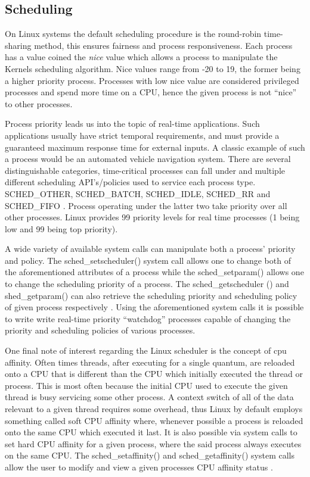     \subsection{\bf Scheduling}
      \normalfont \indent On Linux systems the default scheduling procedure is the round-robin time-sharing method, this ensures fairness and process responsiveness. Each process has a value coined the \textit{nice} value which allows a process to manipulate the Kernels scheduling algorithm. Nice values range from -20 to 19, the former being a higher priority process.  Processes with low nice value are considered privileged processes and spend more time on a CPU, hence the given process is not “nice” to other processes.

      \normalfont \indent Process priority leads us into the topic of real-time applications. Such applications usually have strict temporal requirements, and must provide a guaranteed maximum response time for external inputs. A classic example of such a process would be an automated vehicle navigation system. There are several distinguishable categories, time-critical processes can fall under and multiple different scheduling API’s/policies used to service each process type. SCHED\_OTHER, SCHED\_BATCH, SCHED\_IDLE, SCHED\_RR and SCHED\_FIFO \cite{linuxProgInterface2010}. Process operating under the latter two take priority over all other processes. Linux provides 99 priority levels for real time processes (1 being low and 99 being top priority).

      \normalfont \indent A wide variety of available system calls can manipulate both a process’ priority and policy. The sched\_setscheduler() system call allows one to change both of the aforementioned attributes of a process while the sched\_setparam() allows one to change the scheduling priority of a process. The sched\_getscheduler () and  shed\_getparam() can also retrieve the scheduling priority and scheduling policy of given process respectively \cite{linuxProgInterface2010}. Using the aforementioned system calls it is possible to write write real-time priority “watchdog” processes capable of changing the priority and scheduling policies of various processes.

      \normalfont \indent One final note of interest regarding the Linux scheduler is the concept of cpu affinity. Often times threads, after executing for a single quantum, are reloaded onto a CPU that is different than the CPU which initially executed the thread or process. This is most often because the initial CPU used to execute the given thread is busy servicing some other process. A context switch of all of the data relevant to a given thread requires some overhead, thus Linux by default employs something called soft CPU affinity where, whenever possible a process is reloaded onto the same CPU which executed it last. It is also possible via system calls to set hard CPU affinity for a given process, where the said process always executes on the same CPU. The sched\_setaffinity() and sched\_getaffinity() system calls allow the user to modify and view a given processes CPU affinity status \cite{linuxProgInterface}.

